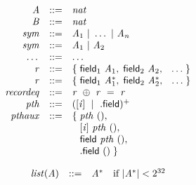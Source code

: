 $$
\begin{array}{@{}lrrl@{}l@{}}
& {\mathit{A}} &::=& {\mathit{nat}} \\
& {\mathit{B}} &::=& {\mathit{nat}} \\
& {\mathit{sym}} &::=& {\mathit{A}}_{{1}} ~|~ \dots ~|~ {\mathit{A}}_{{\mathit{n}}} \\
& {\mathit{sym}} &::=& {\mathit{A}}_{{1}} ~|~ {\mathit{A}}_{{2}} \\
& \dots &::=& \dots \\
& {\mathit{r}} &::=& \{\; \begin{array}[t]{@{}l@{}l@{}}
{\mathsf{field}}_{1}~{\mathit{A}}_{{1}},\; {\mathsf{field}}_{2}~{\mathit{A}}_{{2}},\; {}~\dots \;\}\end{array} \\
& {\mathit{r}} &::=& \{\; \begin{array}[t]{@{}l@{}l@{}}
{\mathsf{field}}_{1}~{{\mathit{A}}_{{1}}^\ast},\; {\mathsf{field}}_{2}~{{\mathit{A}}_{{2}}^\ast},\; {}~\dots \;\}\end{array} \\
& {\mathit{recordeq}} &::=& {\mathit{r}}~\oplus~{\mathit{r}}~=~{\mathit{r}} \\
& {\mathit{pth}} &::=& {({}[{\mathit{i}}]~\mid~{}.\mathsf{field})^{+}} \\
& {\mathit{pthaux}} &::=& \{\; \begin{array}[t]{@{}l@{}l@{}}
{\mathit{pth}}~(),\; \\
  {}[{\mathit{i}}]~{\mathit{pth}}~(),\; \\
  \mathsf{field}~{\mathit{pth}}~(),\; \\
  {}.\mathsf{field}~() \;\}\end{array} \\
\end{array}
$$

\vspace{1ex}

$$
\begin{array}{@{}lrrl@{}l@{}}
& {\mathit{list}}({\mathit{A}}) &::=& {{\mathit{A}}^\ast} &\quad
  \mbox{if}~{|{{\mathit{A}}^\ast}|} < {2^{32}} \\
\end{array}
$$

